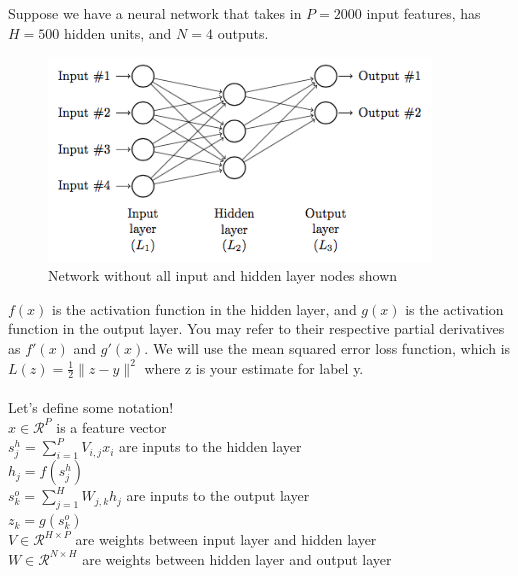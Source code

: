 

Suppose we have a neural network that takes in $P = 2000$ input features, has $H = 500$ hidden units, and $N = 4$ outputs.
\begin{figure}[h!]
\begin{center}
  \includegraphics[width=4in]{src/problems/nn/neural_net.png}
  \caption{Network without all input and hidden layer nodes shown}
\end{center}
\end{figure}

$f(x)$ is the activation function in the hidden layer, and $g(x)$ is the activation function in the output layer. You may refer to their respective partial derivatives as $f'(x)$ and $g'(x)$. We will use the mean squared error loss function, which is $L(z) = \frac{1}{2} \| z - y \|^2$ where z is your estimate for label y.\\\\
Let's define some notation! \\
$x\in \mathcal{R}^{P}$ is a feature vector\\
$s^h_j = \sum_{i=1}^{P} V_{i, j}x_i$ are inputs to the hidden layer \\
$h_j = f(s^h_j)$\\
$s^o_k = \sum_{j=1}^{H} W_{j, k}h_j$ are inputs to the output layer\\
$z_k = g(s^o_k)$ \\
$V \in \mathcal{R}^{H\times P}$ are weights between input layer and hidden layer\\
$W \in \mathcal{R}^{N\times H}$ are weights between hidden layer and output layer\\


